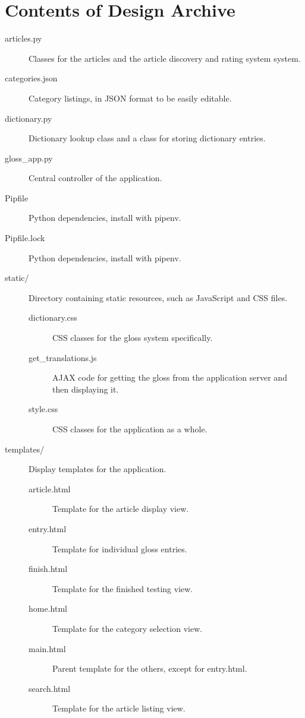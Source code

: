 \chapter{Contents of Design Archive}
\begin{description}
	\item[articles.py] Classes for the articles and the article discovery and rating system system.
	
	\item[categories.json] Category listings, in JSON format to be easily editable.
	
	\item[dictionary.py] Dictionary lookup class and a class for storing dictionary entries.
	
	\item[gloss\_app.py] Central controller of the application.
	
	\item[Pipfile] Python dependencies, install with pipenv.
	
	\item[Pipfile.lock] Python dependencies, install with pipenv.
	
	\item[static/] Directory containing static resources, such as JavaScript and CSS files. 
		\begin{description}
			\item[dictionary.css] CSS classes for the gloss system specifically.
			
			\item[get\_translations.js] AJAX code for getting the gloss from the application server and then displaying it.
			
			\item[style.css] CSS classes for the application as a whole.
		\end{description}
	
	\item[templates/] Display templates for the application.
		\begin{description}
			\item[article.html] Template for the article display view.
			
			\item[entry.html] Template for individual gloss entries.
			
			\item[finish.html] Template for the finished testing view.
			
			\item[home.html] Template for the category selection view.
			
			\item[main.html] Parent template for the others, except for entry.html.
			
			\item[search.html] Template for the article listing view. 
		\end{description}
	

\end{description}